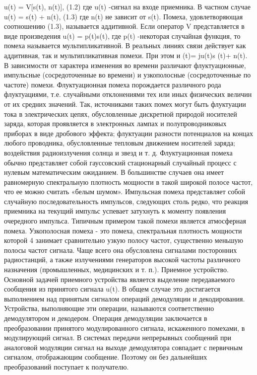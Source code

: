 ﻿\documentclass[a4paper,12pt]{article}
\begin{document}
u(t) = V[s(t), n(t)],	(1.2)
где u(t) -сигнал на входе приемника.
В частном случае
u(t) = s(t) + n(t),	(1.3)
где n(t) не зависит от s(t). Помеха, удовлетворяющая соотношению (1.3), называется аддитивной.
Если оператор V представляется в виде произведения u(t) = p(t)s(t), где p(t) -некоторая случайная функция, то помеха называется мультипликативной. В реальных линиях связи действует как аддитивная, так и мультипликативная помехи. При этом
и (t)= ju(t)s (t)+ n(t).
В зависимости от характера изменения во времени различают флуктуационные, импульсные (сосредоточенные во времени) и узкополосные (сосредоточенные по частоте) помехи. Флуктуационная помеха порождается различного рода флуктуациями, т.е. случайными отклонениями тех или иных физических величин от их средних значений. Так, источниками таких помех могут быть флуктуации тока в электрических цепях, обусловленные дискретной природой носителей заряда, которая проявляется в электронных лампах и полупроводниковых приборах в виде дробового эффекта; флуктуации разности потенциалов на концах любого проводника, обусловленные тепловым движением носителей заряда; воздействия радиоизлучения солнца и звезд и т. д. Флуктуационная помеха обычно представляет собой гауссовский стационарный случайный процесс с нулевым математическим ожиданием. В большинстве случаев она имеет равномерную спектральную плотность мощности в такой широкой полосе частот, что ее можно считать «белым шумом».
Импульсная помеха представляет собой случайную последовательность импульсов, следующих столь редко, что реакция приемника на текущий импульс успевает затухнуть к моменту появления очередного импульса. Типичным примером такой помехи является атмосферная помеха.
Узкополосная помеха - это помеха, спектральная плотность мощности которой
4
занимает сравнительно узкую полосу частот, существенно меньшую полосы частот сигнала. Чаще всего она обусловлена сигналами посторонних радиостанций, а также излучениями генераторов высокой частоты различного назначения (промышленных, медицинских и т. п.).
Приемное устройство. Основной задачей приемного устройства является выделение передаваемого сообщения из принятого сигнала u(t). В общем случае это достигается выполнением над принятым сигналом операций демодуляции и декодирования. Устройства, выполняющие эти операции, называются соответственно демодулятором и декодером.
Операция демодуляции заключается в преобразовании принятого модулированного сигнала, искаженного помехами, в модулирующий сигнал. В системах передачи непрерывных сообщений при аналоговой модуляции сигнал на выходе демодулятора совпадает с первичным сигналом, отображающим сообщение. Поэтому он без дальнейших преобразований поступает к получателю.
\end{document}
